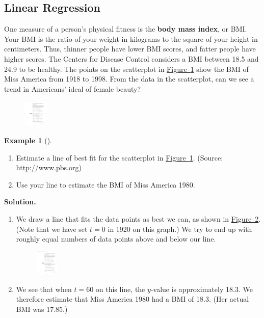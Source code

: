 \documentclass[10pt,]{book}
\newcommand{\terminology}[1]{\textbf{#1}}
\theoremstyle{plain}
\theoremstyle{definition}
\theoremstyle{definition}
\newtheorem{example}[theorem]{Example}
\theoremstyle{definition}
\theoremstyle{definition}
\numberwithin{equation}{section}
\begin{document}
\subsection[Linear Regression]{Linear Regression}\label{subsection-30}

        One measure of a person's physical fitness is the \terminology{body mass index}, or BMI. Your BMI is the ratio of your weight in kilograms to the square of your height in centimeters. Thus, thinner people have lower BMI scores, and fatter people have higher scores. The Centers for Disease Control considers a BMI between 18.5 and 24.9 to be healthy. The points on the scatterplot in \hyperref[fig-BMI]{Figure~\ref{fig-BMI}} show the BMI of Miss America from 1918 to 1998. From the data in the scatterplot, can we see a trend in Americans’ ideal of female beauty?
\leavevmode%
\begin{figure}
\centering
\includegraphics[width=0.100\textwidth,]{images/fig-BMI.pdf}\caption{\label{fig-BMI}}
\end{figure}
\begin{example}[]\label{example-BMI}
\leavevmode%
\begin{enumerate}[label=*\alph**]
\item\hypertarget{li-197}{}Estimate a line of best fit for the scatterplot in \hyperref[fig-BMI]{Figure~\ref{fig-BMI}}. (Source: http://www.pbs.org)\item\hypertarget{li-198}{}Use your line to estimate the BMI of Miss America 1980.\end{enumerate}
\par\medskip\noindent%
\textbf{Solution.}\quad \leavevmode%
\begin{enumerate}[label=*\alph**]
\item\hypertarget{li-199}{}We draw a line that fits the data points as best we can, as shown in \hyperref[fig-BMI2]{Figure~\ref{fig-BMI2}}. (Note that we have set \(t = 0\) in 1920 on this graph.) We try to end up with roughly equal numbers of data points above and below our line. 
        \leavevmode%
\begin{figure}
\centering
\includegraphics[width=0.100\textwidth,]{images/fig-BMI2.pdf}\caption{\label{fig-BMI2}}
\end{figure}
\item\hypertarget{li-200}{}We see that when \(t = 60\) on this line, the \(y\)-value is approximately 18.3. We therefore estimate that Miss America 1980 had a BMI of 18.3. (Her actual BMI was 17.85.)\end{enumerate}
\end{example}
\end{document}
